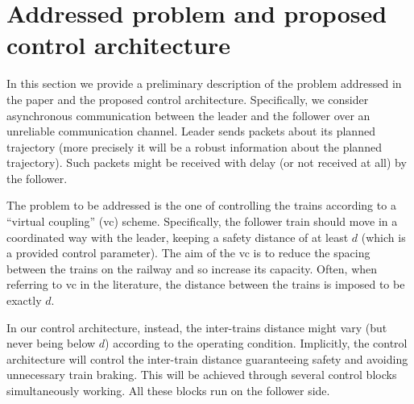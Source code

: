 \documentclass[letterpaper, 10 pt, conference]{ieeeconf}
\theoremstyle{definition}
\theoremstyle{nopoint}
\begin{document}
   
	
	





\section{Addressed problem and proposed control architecture}
 \label{sec:proposedarchitecture}

In this section we provide a preliminary description of the problem addressed in the paper and the proposed control architecture. 
Specifically, we consider asynchronous communication between the leader and the follower over an unreliable communication channel. 
Leader sends packets about its planned trajectory (more precisely it will be a robust information about the planned trajectory). Such packets might be received with delay (or not received at all) by the follower. 

The problem to be addressed is the one of controlling the trains according to a ``virtual coupling'' (\gls{vc}) scheme. Specifically, the follower train should move in a coordinated way with the leader, keeping a safety distance of at least $d$ (which is a provided control parameter). The aim of the \gls{vc} is to reduce the spacing between the trains on the railway and so increase its capacity. 
Often, when referring to \gls{vc} in the literature, the distance between the trains is imposed to be exactly $d$. 

In our control architecture, instead, the inter-trains distance might vary (but never being below $d$) according to the operating condition. Implicitly, the control architecture will  control the inter-train distance guaranteeing safety and avoiding unnecessary train braking. 
This will be achieved through several control blocks simultaneously working. All these blocks run on the follower side. 
\end{document}
